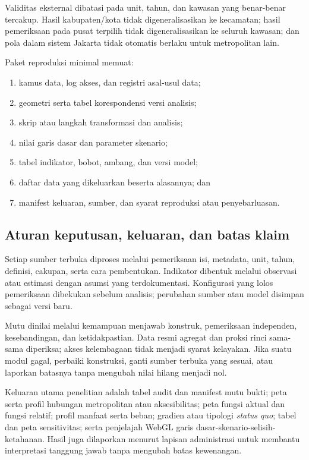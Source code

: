 \documentclass[11pt,a4paper,oneside,openany,indonesian]{report}
\begin{document}
Validitas eksternal dibatasi pada unit, tahun, dan kawasan yang
benar-benar tercakup. Hasil kabupaten/kota tidak digeneralisasikan ke
kecamatan; hasil pemeriksaan pada pusat terpilih tidak digeneralisasikan
ke seluruh kawasan; dan pola dalam sistem Jakarta tidak otomatis berlaku
untuk metropolitan lain.

Paket reproduksi minimal memuat:

\begin{enumerate}
\def\labelenumi{\arabic{enumi}.}
\tightlist
\item
  kamus data, log akses, dan registri asal-usul data;
\item
  geometri serta tabel korespondensi versi analisis;
\item
  skrip atau langkah transformasi dan analisis;
\item
  nilai garis dasar dan parameter skenario;
\item
  tabel indikator, bobot, ambang, dan versi model;
\item
  daftar data yang dikeluarkan beserta alasannya; dan
\item
  manifest keluaran, sumber, dan syarat reproduksi atau penyebarluasan.
\end{enumerate}

\subsection{Aturan keputusan, keluaran, dan batas
klaim}\label{aturan-keputusan-keluaran-dan-batas-klaim}

Setiap sumber terbuka diproses melalui pemeriksaan isi, metadata, unit,
tahun, definisi, cakupan, serta cara pembentukan. Indikator dibentuk
melalui observasi atau estimasi dengan asumsi yang terdokumentasi.
Konfigurasi yang lolos pemeriksaan dibekukan sebelum analisis; perubahan
sumber atau model disimpan sebagai versi baru.

Mutu dinilai melalui kemampuan menjawab konstruk, pemeriksaan
independen, kesebandingan, dan ketidakpastian. Data resmi agregat dan
proksi rinci sama-sama diperiksa; akses kelembagaan tidak menjadi syarat
kelayakan. Jika suatu modul gagal, perbaiki konstruksi, ganti sumber
terbuka yang sesuai, atau laporkan batasnya tanpa mengubah nilai hilang
menjadi nol.

Keluaran utama penelitian adalah tabel audit dan manifest mutu bukti;
peta serta profil hubungan metropolitan atau aksesibilitas; peta fungsi
aktual dan fungsi relatif; profil manfaat serta beban; gradien atau
tipologi \emph{status quo}; tabel dan peta sensitivitas; serta
penjelajah WebGL garis dasar-skenario-selisih-ketahanan. Hasil juga
dilaporkan menurut lapisan administrasi untuk membantu interpretasi
tanggung jawab tanpa mengubah batas kewenangan.
\end{document}
